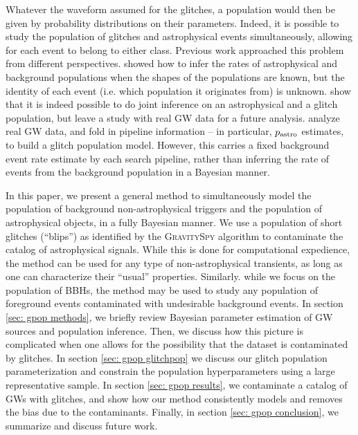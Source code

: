 \begin{refsection}
Whatever the waveform assumed for the glitches, a population would then be given by probability distributions on their parameters. Indeed, it is possible to study the population of glitches and astrophysical events simultaneously, allowing for each event to belong to either class. Previous work approached this problem from different perspectives. \cite{2015PhRvD..91b3005F} showed how to infer the rates of astrophysical and background populations when the shapes of the populations are known, but the identity of each event (i.e. which population it originates from) is unknown.  \cite{2019MNRAS.484.4008G} show that it is indeed possible to do joint inference on an astrophysical and a glitch population, but leave a study with real GW data for a future analysis.  \cite{2020PhRvD.102l3022R, 2020PhRvD.102h3026G} analyze real GW data, and fold in pipeline information -- in particular, $p_{\rm astro}$ estimates, to build a glitch population model. However, this carries a fixed background event rate estimate by each search pipeline, rather than inferring the rate of events from the background population in a Bayesian manner. 

In this paper, we present a general method to simultaneously model the population of background non-astrophysical triggers and the population of astrophysical objects, in a fully Bayesian manner. We use a population of short glitches (``blips'') as identified by the \textsc{GravitySpy} algorithm \citep{2017CQGra..34f4003Z} to contaminate the catalog of astrophysical signals. While this is done for computational expedience, the method can be used for any type of non-astrophysical transients, as long as one can characterize their ``usual'' properties. Similarly. while we focus on the population of BBHs, the method may be used to study any population of foreground events contaminated with undesirable background events. In section \ref{sec: gpop methods}, we briefly review Bayesian parameter estimation of GW sources and population inference. Then, we discuss how this picture is complicated when one allows for the possibility that the dataset is contaminated by glitches. In section \ref{sec: gpop glitchpop} we discuss our glitch population parameterization and constrain the population hyperparameters using a large representative sample. In section \ref{sec: gpop results}, we contaminate a catalog of GWs with glitches, and show how our method consistently models and removes the bias due to the contaminants. Finally, in section \ref{sec: gpop conclusion}, we summarize and discuss future work.



\end{refsection}
